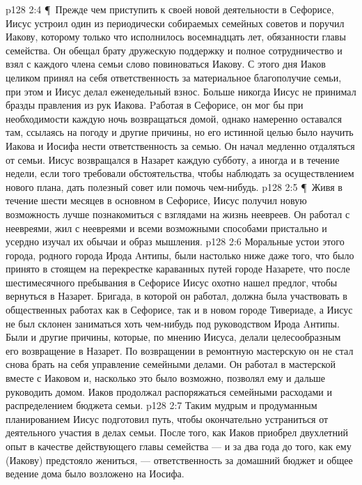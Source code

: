 \vs p128 2:4 \P\ Прежде чем приступить к своей новой деятельности в Сефорисе, Иисус устроил один из периодически собираемых семейных советов и поручил Иакову, которому только что исполнилось восемнадцать лет, обязанности главы семейства. Он обещал брату дружескую поддержку и полное сотрудничество и взял с каждого члена семьи слово повиноваться Иакову. С этого дня Иаков целиком принял на себя ответственность за материальное благополучие семьи, при этом и Иисус делал еженедельный взнос. Больше никогда Иисус не принимал бразды правления из рук Иакова. Pаботая в Сефорисе, он мог бы при необходимости каждую ночь возвращаться домой, однако намеренно оставался там, ссылаясь на погоду и другие причины, но его истинной целью было научить Иакова и Иосифа нести ответственность за семью. Он начал медленно отдаляться от семьи. Иисус возвращался в Назарет каждую субботу, а иногда и в течение недели, если того требовали обстоятельства, чтобы наблюдать за осуществлением нового плана, дать полезный совет или помочь чем\hyp{}нибудь.
\vs p128 2:5 \P\ Живя в течение шести месяцев в основном в Сефорисе, Иисус получил новую возможность лучше познакомиться с взглядами на жизнь неевреев. Он работал с неевреями, жил с неевреями и всеми возможными способами пристально и усердно изучал их обычаи и образ мышления.
\vs p128 2:6 Моральные устои этого города, родного города Ирода Aнтипы, были настолько ниже даже того, что было принято в стоящем на перекрестке караванных путей городе Назарете, что после шестимесячного пребывания в Сефорисе Иисус охотно нашел предлог, чтобы вернуться в Назарет. Бригада, в которой он работал, должна была участвовать в общественных работах как в Сефорисе, так и в новом городе Тивериаде, а Иисус не был склонен заниматься хоть чем\hyp{}нибудь под руководством Ирода Aнтипы. Были и другие причины, которые, по мнению Иисуса, делали целесообразным его возвращение в Назарет. По возвращении в ремонтную мастерскую он не стал снова брать на себя управление семейными делами. Он работал в мастерской вместе с Иаковом и, насколько это было возможно, позволял ему и дальше руководить домом. Иаков продолжал распоряжаться семейными расходами и распределением бюджета семьи.
\vs p128 2:7 Таким мудрым и продуманным планированием Иисус подготовил путь, чтобы окончательно устраниться от деятельного участия в делах семьи. После того, как Иаков приобрел двухлетний опыт в качестве действующего главы семейства --- и за два года до того, как ему (Иакову) предстояло жениться, --- ответственность за домашний бюджет и общее ведение дома было возложено на Иосифа.
